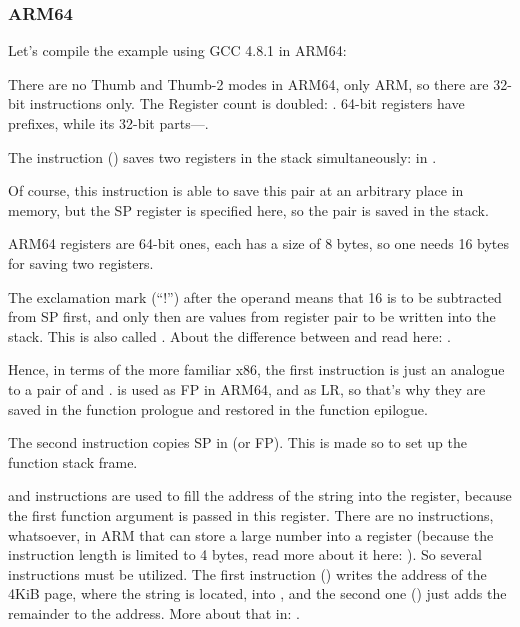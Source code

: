 ﻿\subsubsection{ARM64}


Let's compile the example using GCC 4.8.1 in ARM64:



There are no Thumb and Thumb-2 modes in ARM64, only ARM, so there are 32-bit instructions only.
The Register count is doubled: .
64-bit registers have  prefixes, while its 32-bit parts---.

The  instruction () 
saves two registers in the stack simultaneously:  in .

Of course, this instruction is able to save this pair at an arbitrary place in memory, 
but the \ac{SP} register is specified here, so the pair is saved in the stack.

ARM64 registers are 64-bit ones, each has a size of 8 bytes, so one needs 16 bytes for saving two registers.

The exclamation mark (``!'') after the operand means that 16 is to be subtracted from \ac{SP} first, and only then
are values from register pair to be written into the stack.
This is also called .
About the difference between  and  
read here: .

Hence, in terms of the more familiar x86, the first instruction is just an analogue to a pair of
 and .
 is used as \ac{FP} in ARM64, and  
as \ac{LR}, so that's why they are saved in the function prologue and restored in the function epilogue.

The second instruction copies \ac{SP} in  (or \ac{FP}).
This is made so to set up the function stack frame.

\label{pointers_ADRP_and_ADD}
 and \ADD instructions are used to fill the 
address of the string  into the  register, 
because the first function argument is passed
in this register.
There are no instructions, whatsoever, in ARM that can store a large number into a register (because the instruction
length is limited to 4 bytes, read more about it here: ).
So several instructions must be utilized. The first instruction () writes the address of the 4KiB page, where the string is
located, into , 
and the second one (\ADD) just adds the remainder to the address.
More about that in: .

